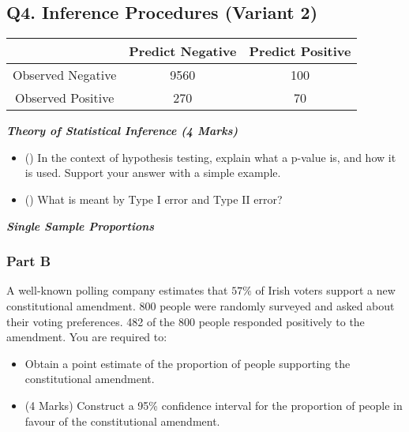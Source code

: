 \documentclass[]{article}
\begin{document}
\subsection*{Q4. Inference Procedures (Variant 2)}


\begin{center}
\begin{tabular}{|c|c|c|}
\hline  & \phantom{spa}Predict Negative\phantom{spa} & \phantom{spa}Predict Positive\phantom{spa} \\ 
\hline\phantom{spa} Observed Negative \phantom{spa}&	9560	&	100	\\ 
\hline \phantom{spa}Observed Positive\phantom{spa} & 	270	&	70	\\ 
\hline 
\end{tabular} 
\end{center}


\item[(b)] \textbf{\textit{Theory of Statistical Inference (4 Marks)}}\\
\begin{itemize}

\item[i.]() In the context of hypothesis testing, explain what a p-value is, and how it is used. Support your answer with a simple example.

\item[ii.]() What is meant by Type I error and Type II error?
\end{itemize}


\item[(c)] \textbf{\textit{Single Sample Proportions }}\\
\subsubsection*{Part B} %
A well-known polling company estimates that $57\%$ of Irish voters support a new constitutional amendment. 800 people were randomly surveyed and asked about their voting preferences. 482 of the 800 people responded positively to the amendment. You are required to:

\begin{itemize}

\item [i.] Obtain a point estimate of the proportion of people supporting the constitutional amendment.

\item [ii.](4 Marks) Construct a 95\% confidence interval for the proportion of people in favour of the constitutional amendment.
\end{itemize}
\end{document}
